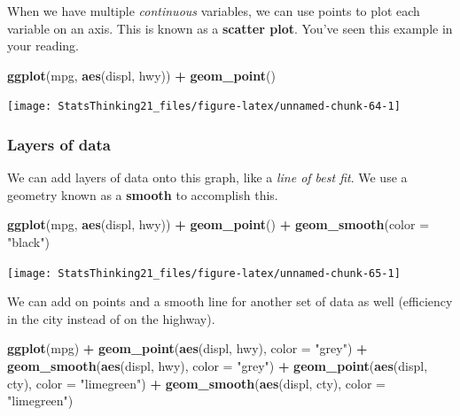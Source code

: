 \documentclass[12pt,]{book}
\newenvironment{Shaded}{\begin{snugshade}}{\end{snugshade}}
\newcommand{\DataTypeTok}[1]{\textcolor[rgb]{0.13,0.29,0.53}{#1}}
\newcommand{\KeywordTok}[1]{\textcolor[rgb]{0.13,0.29,0.53}{\textbf{#1}}}
\newcommand{\NormalTok}[1]{#1}
\newcommand{\OperatorTok}[1]{\textcolor[rgb]{0.81,0.36,0.00}{\textbf{#1}}}
\newcommand{\StringTok}[1]{\textcolor[rgb]{0.31,0.60,0.02}{#1}}
\begin{document}
When we have multiple \emph{continuous} variables, we can use points to plot each variable on an axis. This is known as a \textbf{scatter plot}. You've seen this example in your reading.

\begin{Shaded}
\begin{Highlighting}[]
\KeywordTok{ggplot}\NormalTok{(mpg, }\KeywordTok{aes}\NormalTok{(displ, hwy)) }\OperatorTok{+}
\StringTok{  }\KeywordTok{geom_point}\NormalTok{()}
\end{Highlighting}
\end{Shaded}

\texttt{[image: StatsThinking21\_files/figure-latex/unnamed-chunk-64-1]}

\hypertarget{layers-of-data}{%
\subsubsection{Layers of data}\label{layers-of-data}}

We can add layers of data onto this graph, like a \emph{line of best fit}. We use a geometry known as a \textbf{smooth} to accomplish this.

\begin{Shaded}
\begin{Highlighting}[]
\KeywordTok{ggplot}\NormalTok{(mpg, }\KeywordTok{aes}\NormalTok{(displ, hwy)) }\OperatorTok{+}
\StringTok{  }\KeywordTok{geom_point}\NormalTok{() }\OperatorTok{+}
\StringTok{  }\KeywordTok{geom_smooth}\NormalTok{(}\DataTypeTok{color =} \StringTok{"black"}\NormalTok{)}
\end{Highlighting}
\end{Shaded}

\texttt{[image: StatsThinking21\_files/figure-latex/unnamed-chunk-65-1]}

We can add on points and a smooth line for another set of data as well (efficiency in the city instead of on the highway).

\begin{Shaded}
\begin{Highlighting}[]
\KeywordTok{ggplot}\NormalTok{(mpg) }\OperatorTok{+}
\StringTok{  }\KeywordTok{geom_point}\NormalTok{(}\KeywordTok{aes}\NormalTok{(displ, hwy), }\DataTypeTok{color =} \StringTok{"grey"}\NormalTok{) }\OperatorTok{+}
\StringTok{  }\KeywordTok{geom_smooth}\NormalTok{(}\KeywordTok{aes}\NormalTok{(displ, hwy), }\DataTypeTok{color =} \StringTok{"grey"}\NormalTok{) }\OperatorTok{+}
\StringTok{  }\KeywordTok{geom_point}\NormalTok{(}\KeywordTok{aes}\NormalTok{(displ, cty), }\DataTypeTok{color =} \StringTok{"limegreen"}\NormalTok{) }\OperatorTok{+}
\StringTok{  }\KeywordTok{geom_smooth}\NormalTok{(}\KeywordTok{aes}\NormalTok{(displ, cty), }\DataTypeTok{color =} \StringTok{"limegreen"}\NormalTok{)}
\end{Highlighting}
\end{Shaded}
\end{document}

